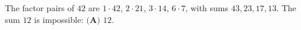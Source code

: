The factor pairs of \(42\) are \(1\cdot 42\), \(2\cdot 21\), \(3\cdot 14\), \(6\cdot 7\), with sums \(43,23,17,13\). The sum \(12\) is impossible: \(\boxed{\textbf{(A) } 12}\).
